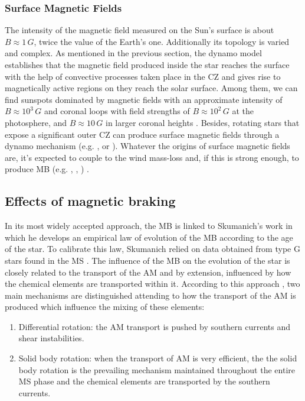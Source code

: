 \documentclass[fleqn,usenatbib]{mnras}
\begin{document}
\subsubsection{Surface Magnetic Fields} \label{surf_mf}
The intensity of the magnetic field measured on the Sun's surface is about $B\approx1\, G$, twice the value of the Earth's one. Additionally its topology is varied and complex. As mentioned in the previous section, the dynamo model establishes that the magnetic field produced inside the star reaches the surface with the help of convective processes taken place in the CZ and gives rise to magnetically active regions on they reach the solar surface. Among them, we can find sunspots dominated by magnetic fields with an approximate intensity of $B\approx10^3\, G$ and coronal loops with field strengths of $B\approx10^2\, G$ at the photosphere, and $B\approx 10\, G$ in larger coronal heights \citep{Aschwanden2014}. Besides, rotating stars that expose a significant outer CZ can produce surface magnetic fields through a dynamo mechanism (e.g. \citet{Brandenburg2004}, \citet{Charbonneau2010} or \citet{Brun2017}). Whatever the origins of surface magnetic fields are, it's expected to couple to the wind mass-loss and, if this is strong enough, to produce MB (e.g. \citet{UdDoula2002}, \citet{Ud-Doula2007}, \citet{Ud-Doula2008} \citet{Meynet2010}) .\par

\subsection{Effects of magnetic braking}
In its most widely accepted approach, the MB is linked to Skumanich's work in which he develops an empirical law of evolution of the MB according to the age of the star. To calibrate this law, Skumanich relied on data obtained from type G stars found in the MS \citep{Skumanich1972}. The influence of the MB on the evolution of the star is closely related to the transport of the AM and by extension, influenced by how the chemical elements are transported within it. According to this approach \citep{Meynet2010}, two main mechanisms are distinguished attending to how the transport of the AM is produced which influence the mixing of these elements:

\begin{enumerate}
    \item Differential rotation: the AM transport is pushed by southern currents and shear instabilities.
    \item Solid body rotation: when the transport of AM is very efficient, the the solid body rotation is the prevailing mechanism maintained throughout the entire MS phase and the chemical elements are transported by the southern currents.
\end{enumerate}
\end{document}
